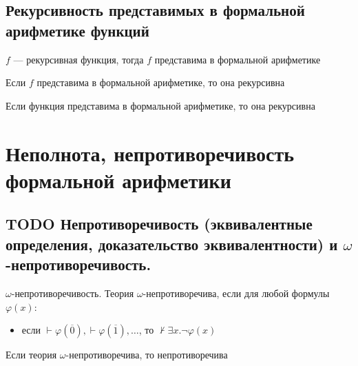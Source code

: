 \documentclass[english]{article}
\begin{document}
\subsection{Рекурсивность представимых в формальной арифметике функций}
\label{sec:orgd546203}
\begin{theorem}
	\(f\) --- рекурсивная функция, тогда \(f\) представима в формальной арифметике
	\label{orgef430f0}
\end{theorem}
\begin{theorem}
	Если \(f\) представима в формальной арифметике, то она рекурсивна
	\label{orga2fc517}
\end{theorem}
\begin{theorem}
	Если функция представима в формальной арифметике, то она рекурсивна
	\label{org770dd7e}
\end{theorem}
\section{Неполнота, непротиворечивость формальной арифметики}
\label{sec:org7bcdb3a}
\subsection{{\bfseries\sffamily TODO} Непротиворечивость (эквивалентные определения, доказательство эквивалентности) и \(\omega\)-непротиворечивость.}
\label{sec:org3dd0e46}
\begin{definition}
	\(\omega\)-непротиворечивость. Теория \(\omega\)-непротиворечива, если для любой формулы \(\varphi(x)\):
	\begin{itemize}
		\item если \(\vdash \varphi(\overline{0}), \vdash \varphi(\overline{1}), \dots\), то \(\not\vdash \exists x. \neg \varphi(x)\)
	\end{itemize}
	\label{orgd81f148}
\end{definition}
\begin{lemma}
	Если теория \(\omega\)-непротиворечива, то непротиворечива
	\label{orge33d28f}
\end{lemma}
\end{document}
